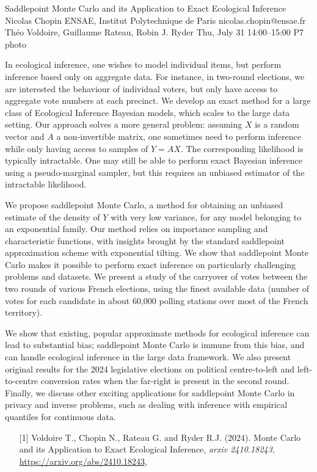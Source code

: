 \clearpage
\begin{talk}
  {Saddlepoint Monte Carlo and its Application to Exact Ecological Inference}%
  {Nicolas Chopin}%
  {ENSAE, Institut Polytechnique de Paris}%
  {nicolas.chopin@ensae.fr}%
  {Théo Voldoire, Guillaume Rateau, Robin J. Ryder}%
  {}%
  {Thu, July 31 14:00–15:00}%
  {P7}%
  {photo}%
  
				
			
\vspace{-5ex}
In ecological inference, one wishes to model individual items, but perform
inference based only on aggregate data.  For instance, in two-round elections,
we are interested the behaviour of individual voters, but only have access to
aggregate vote numbers at each precinct.  We develop an exact method for a
large class of Ecological Inference Bayesian models, which scales  to the large
data setting.  Our approach solves a more general problem:  assuming $X$ is a
random vector and $A$ a non-invertible matrix, one sometimes need to perform
inference while only having access to samples of $Y=AX$. The corresponding
likelihood is typically intractable. One may still be able to perform exact
Bayesian inference using a pseudo-marginal sampler, but this requires an
unbiased estimator of the intractable likelihood.

We propose saddlepoint Monte Carlo, a method for obtaining an unbiased estimate
of the density of $Y$ with very low variance, for any model belonging to an
exponential family. Our method relies on importance sampling and 
characteristic functions, with insights brought by the standard saddlepoint
approximation scheme with exponential tilting.  We show that saddlepoint Monte
Carlo makes it possible to perform exact inference on particularly challenging
problems and datasets.  We present a study of the carryover of votes between
the two rounds of various French elections, using the finest available data
(number of votes for each candidate in about 60,000 polling stations over most
of the French territory). 

We show that existing, popular approximate methods for ecological inference can
lead to substantial bias; saddlepoint Monte Carlo is immune from this bias, and 
can handle ecological inference in the large data framework. We also
present original results for the 2024 legislative elections on political
centre-to-left and left-to-centre conversion rates when the far-right is
present in the second round. Finally, we discuss other exciting applications
for saddlepoint Monte Carlo in privacy and inverse problems, such as dealing
with inference with empirical quantiles for continuous data.

\medskip

\begin{enumerate}
	\item[{[1]}] 
      Voldoire T., Chopin N., Rateau G. and Ryder R.J. (2024).
      Monte Carlo and its Application to Exact Ecological Inference, 
      \textit{arxiv 2410.18243},
      \url{https://arxiv.org/abs/2410.18243}, 
\end{enumerate}

\end{talk}

